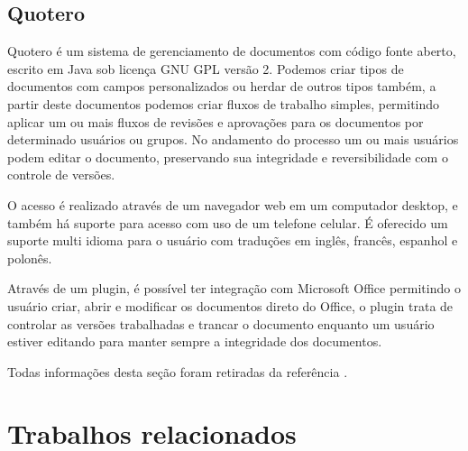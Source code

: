 \documentclass{abnt}
\begin{document}
		
	\clearpage	
	\section{Quotero}
	
	Quotero é um sistema de gerenciamento de documentos com código fonte aberto, escrito em Java sob licença GNU GPL
	versão 2. Podemos criar tipos de documentos com campos personalizados ou herdar de outros tipos também, a partir deste
	documentos podemos criar fluxos de trabalho simples, permitindo aplicar um ou mais fluxos de revisões e aprovações para
	os documentos por determinado usuários ou grupos. No andamento do processo um ou mais usuários podem editar o
	documento, preservando sua integridade e reversibilidade com o controle de versões.
	
	O acesso é realizado através de um navegador web em um computador desktop, e também há suporte para acesso com uso de
	um telefone celular. É oferecido um suporte multi idioma para o usuário com traduções em inglês, francês, espanhol e
	polonês.
	
	Através de um plugin, é possível ter integração com Microsoft Office permitindo o usuário criar, abrir e modificar os
	documentos direto do Office, o plugin trata de controlar as versões trabalhadas e trancar o documento enquanto um
	usuário estiver editando para manter sempre a integridade dos documentos.
	
	Todas informações desta seção foram retiradas da referência \cite{QUOTERO}.
	
	

\clearpage
\chapter{Trabalhos relacionados}
		
\end{document}
